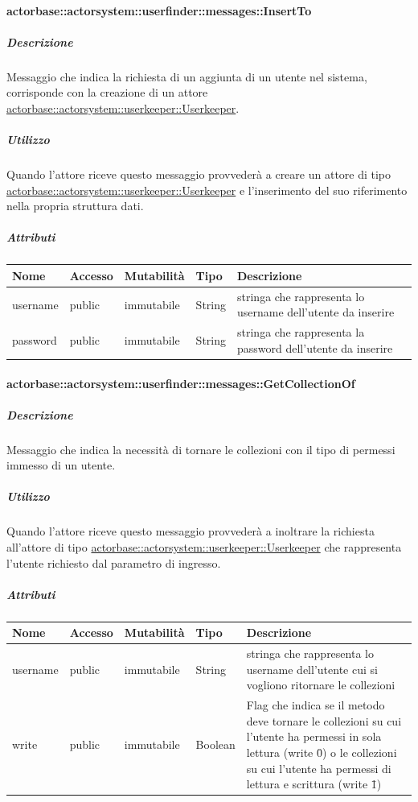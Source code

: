\documentclass{scalatekids-article}
\begin{document}
\paragraph{actorbase::actorsystem::userfinder::messages::InsertTo}
\label{sec:actorbase::actorsystem::userfinder::messages::InsertTo}

\subparagraph{Descrizione}
Messaggio che indica la richiesta di un aggiunta di un utente nel sistema,
corrisponde con la creazione di un attore \hyperref[sec:actorbase::actorsystem::userkeeper::Userkeeper]{actorbase::\allowbreak{}actorsystem::\allowbreak{}userkeeper::\allowbreak{}Userkeeper}.

\subparagraph{Utilizzo}
Quando l'attore riceve questo messaggio provvederà a creare un attore di tipo \hyperref[sec:actorbase::actorsystem::userkeeper::Userkeeper]{actorbase::\allowbreak{}actorsystem::\allowbreak{}userkeeper::\allowbreak{}Userkeeper}
e l'inserimento del suo riferimento nella propria struttura dati.

\subparagraph{Attributi}
\begin{tabular}{| p{3cm} | p{1.5cm} | p{2cm} | p{2cm} | p{8.5cm} |}
  \hline
  Nome & Accesso & Mutabilità & Tipo & Descrizione\\
  \hline
  username & public & immutabile & String & stringa che rappresenta lo username dell'utente da inserire \\
  \hline
  password & public & immutabile & String & stringa che rappresenta la password dell'utente da inserire \\
  \hline
\end{tabular}

\paragraph{actorbase::actorsystem::userfinder::messages::GetCollectionOf}
\label{sec:actorbase::actorsystem::userfinder::messages::GetCollectionOf}

\subparagraph{Descrizione}
Messaggio che indica la necessità di tornare le collezioni con il tipo di permessi immesso di un utente.

\subparagraph{Utilizzo}
Quando l'attore riceve questo messaggio provvederà a inoltrare la richiesta all'attore di tipo \hyperref[sec:actorbase::actorsystem::userkeeper::Userkeeper]{actorbase::\allowbreak{}actorsystem::\allowbreak{}userkeeper::\allowbreak{}Userkeeper}
che rappresenta l'utente richiesto dal parametro di ingresso.

\subparagraph{Attributi}
\begin{tabular}{| p{3cm} | p{1.5cm} | p{2cm} | p{2cm} | p{8.5cm} |}
  \hline
  Nome & Accesso & Mutabilità & Tipo & Descrizione\\
  \hline
  username & public & immutabile & String & stringa che rappresenta lo username dell'utente cui si vogliono ritornare le collezioni \\
  \hline
  write & public & immutabile & Boolean & Flag che indica se il metodo deve tornare le collezioni su cui l'utente ha permessi in sola lettura (write \= 0) o le collezioni su cui l'utente ha permessi di lettura e scrittura (write \= 1) \\
  \hline
\end{tabular}
\end{document}

